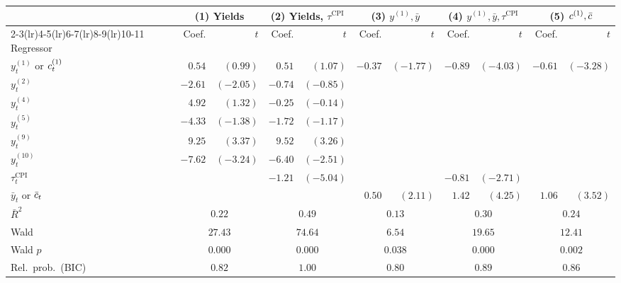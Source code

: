 \footnotesize
\setlength{\tabcolsep}{4pt}
\begin{tabular}{l rr rr rr rr rr}
  \toprule
  & \multicolumn{2}{c}{(1) Yields}
  & \multicolumn{2}{c}{(2) Yields, $\tau^{\mathrm{CPI}}$}
  & \multicolumn{2}{c}{(3) $y^{(1)},\bar{y}$}
  & \multicolumn{2}{c}{(4) $y^{(1)},\bar{y},\tau^{\mathrm{CPI}}$}
  & \multicolumn{2}{c}{(5) $c^{(1)},\bar{c}$} \\
  \cmidrule(lr){2-3}\cmidrule(lr){4-5}\cmidrule(lr){6-7}\cmidrule(lr){8-9}\cmidrule(lr){10-11}
  Regressor & Coef. & $t$ & Coef. & $t$ & Coef. & $t$ & Coef. & $t$ & Coef. & $t$ \\
  \midrule
  $y^{(1)}_{t}$ or $c^{(1)}_{t}$
              & $0.54$  & $(0.99)$  & $0.51$  & $(1.07)$  & $-0.37$ & $(-1.77)$ & $-0.89$ & $(-4.03)$ & $-0.61$ & $(-3.28)$ \\
  $y^{(2)}_{t}$  & $-2.61$ & $(-2.05)$ & $-0.74$ & $(-0.85)$ & & & & & & \\
  $y^{(4)}_{t}$  & $4.92$  & $(1.32)$  & $-0.25$ & $(-0.14)$  & & & & & & \\
  $y^{(5)}_{t}$  & $-4.33$ & $(-1.38)$ & $-1.72$ & $(-1.17)$ & & & & & & \\
  $y^{(9)}_{t}$  & $9.25$  & $(3.37)$  & $9.52$  & $(3.26)$  & & & & & & \\
  $y^{(10)}_{t}$ & $-7.62$ & $(-3.24)$ & $-6.40$ & $(-2.51)$ & & & & & & \\
  $\tau^{\mathrm{CPI}}_{t}$
              & & & $-1.21$ & $(-5.04)$ & & & $-0.81$ & $(-2.71)$ & & \\
  $\bar{y}_{t}$ or $\bar{c}_{t}$
              & & & & & $0.50$ & $(2.11)$ & $1.42$ & $(4.25)$ & $1.06$ & $(3.52)$ \\
  \midrule
  $\bar{R}^{2}$    & \multicolumn{2}{c}{$0.22$}  & \multicolumn{2}{c}{$0.49$}  & \multicolumn{2}{c}{$0.13$}  & \multicolumn{2}{c}{$0.30$}  & \multicolumn{2}{c}{$0.24$} \\
  Wald             & \multicolumn{2}{c}{$27.43$} & \multicolumn{2}{c}{$74.64$} & \multicolumn{2}{c}{$6.54$}  & \multicolumn{2}{c}{$19.65$} & \multicolumn{2}{c}{$12.41$} \\
  Wald $p$         & \multicolumn{2}{c}{$0.000$} & \multicolumn{2}{c}{$0.000$} & \multicolumn{2}{c}{$0.038$} & \multicolumn{2}{c}{$0.000$} & \multicolumn{2}{c}{$0.002$} \\
  Rel.\ prob.\ (BIC) & \multicolumn{2}{c}{$0.82$} & \multicolumn{2}{c}{$1.00$} & \multicolumn{2}{c}{$0.80$} & \multicolumn{2}{c}{$0.89$} & \multicolumn{2}{c}{$0.86$} \\
  \bottomrule
\end{tabular}

